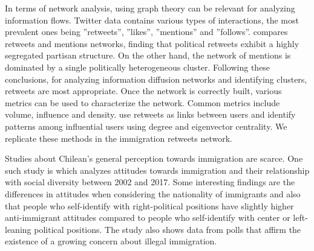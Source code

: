     In terms of network analysis, using graph theory can be relevant for analyzing information flows. Twitter data contains various types of interactions, the most prevalent ones being ''retweets'', ''likes'', ''mentions'' and ''follows''. \cite{conover2011political} compares retweets and mentions networks, finding that political retweets exhibit a highly segregated partisan structure. On the other hand, the  network of mentions is dominated by a single politically heterogeneous cluster. %
    Following these conclusions, for analyzing information diffusion networks and identifying clusters, retweets are most appropriate. %
    Once the network is correctly built, various metrics can be used to characterize the network. Common metrics include volume, influence and density. \cite{maharani2014degree} use retweets as links between users and identify patterns among influential users using degree and eigenvector centrality. We replicate these methods in the immigration retweets network. %
    
    
    Studies about Chilean's general perception towards immigration are scarce. One such study is \cite{gonzalez2019como} which analyzes attitudes towards immigration and their relationship with social diversity between 2002 and 2017. Some interesting findings are the differences in attitudes when considering the nationality of immigrants and also that people who self-identify with right-political positions have slightly higher anti-immigrant attitudes compared to people who self-identify with center or left-leaning political positions. The study also shows data from polls that affirm the existence of a growing concern about illegal immigration.
    
    
